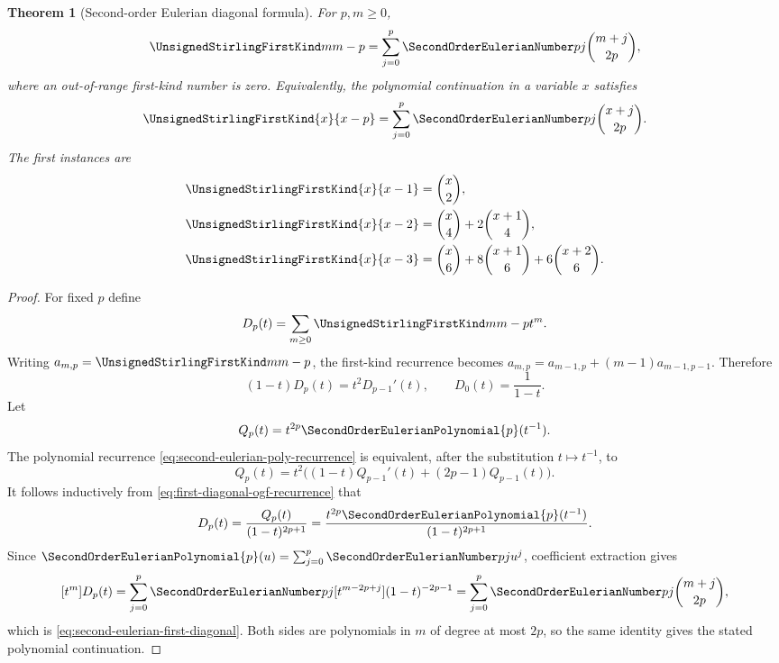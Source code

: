 \documentclass[11pt,a4paper,oneside,openany]{book}
\newtheorem{theorem}{Theorem}[chapter]
\theoremstyle{definition}
\theoremstyle{remark}
\begin{document}
\begin{theorem}[Second-order Eulerian diagonal formula]
\label{thm:second-eulerian-first-diagonal}
For $p,m\ge0$,
\begin{equation}
\label{eq:second-eulerian-first-diagonal}
 \UnsignedStirlingFirstKind m{m-p}
 =\sum_{j=0}^{p}\SecondOrderEulerianNumber pj\binom{m+j}{2p},
\end{equation}
where an out-of-range first-kind number is zero.  Equivalently, the polynomial
continuation in a variable $x$ satisfies
\[
 \UnsignedStirlingFirstKind{x}{x-p}
 =\sum_{j=0}^{p}\SecondOrderEulerianNumber pj\binom{x+j}{2p}.
\]
The first instances are
\begin{align*}
 \UnsignedStirlingFirstKind{x}{x-1}&=\binom{x}{2},\\
 \UnsignedStirlingFirstKind{x}{x-2}&=\binom{x}{4}+2\binom{x+1}{4},\\
 \UnsignedStirlingFirstKind{x}{x-3}&=\binom{x}{6}+8\binom{x+1}{6}
                    +6\binom{x+2}{6}.
\end{align*}
\end{theorem}
\begin{proof}
For fixed $p$ define
\[
 D_p(t)=\sum_{m\ge0}\UnsignedStirlingFirstKind m{m-p}t^m.
\]
Writing $a_{m,p}=\UnsignedStirlingFirstKind m{m-p}$, the first-kind recurrence becomes
$a_{m,p}=a_{m-1,p}+(m-1)a_{m-1,p-1}$.  Therefore
\begin{equation}
\label{eq:first-diagonal-ogf-recurrence}
 (1-t)D_p(t)=t^2D_{p-1}'(t),
 \qquad D_0(t)=\frac1{1-t}.
\end{equation}
Let
\[
 Q_p(t)=t^{2p}\SecondOrderEulerianPolynomial{p}(t^{-1}).
\]
The polynomial recurrence \eqref{eq:second-eulerian-poly-recurrence} is equivalent,
after the substitution $t\mapsto t^{-1}$, to
\[
 Q_p(t)=t^2\bigl((1-t)Q_{p-1}'(t)+(2p-1)Q_{p-1}(t)\bigr).
\]
It follows inductively from \eqref{eq:first-diagonal-ogf-recurrence} that
\begin{equation}
\label{eq:first-diagonal-second-eulerian-ogf}
 D_p(t)=\frac{Q_p(t)}{(1-t)^{2p+1}}
 =\frac{t^{2p}\SecondOrderEulerianPolynomial{p}(t^{-1})}{(1-t)^{2p+1}}.
\end{equation}
Since $\SecondOrderEulerianPolynomial{p}(u)=\sum_{j=0}^{p}\SecondOrderEulerianNumber pj u^j$, coefficient extraction gives
\[
 [t^m]D_p(t)
 =\sum_{j=0}^{p}\SecondOrderEulerianNumber pj
   [t^{m-2p+j}](1-t)^{-2p-1}
 =\sum_{j=0}^{p}\SecondOrderEulerianNumber pj\binom{m+j}{2p},
\]
which is \eqref{eq:second-eulerian-first-diagonal}.  Both sides are polynomials in
$m$ of degree at most $2p$, so the same identity gives the stated polynomial
continuation.
\end{proof}
\end{document}
